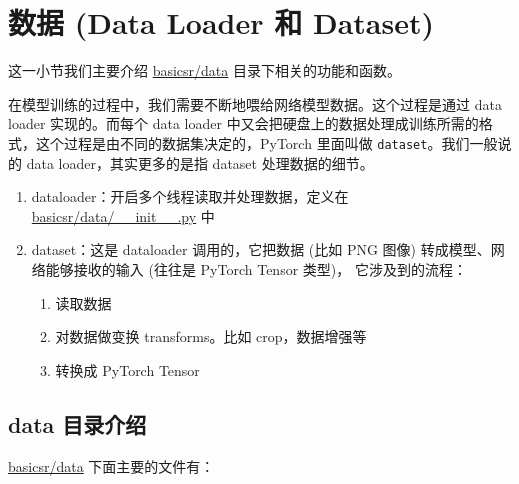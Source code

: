 \documentclass[../main.tex]{subfiles}
\begin{document}
\section{数据 (Data Loader 和 Dataset)}\label{code_structure:data}

这一小节我们主要介绍 \href{https://github.com/XPixelGroup/BasicSR/tree/master/basicsr/data}{basicsr/data} 目录下相关的功能和函数。

在模型训练的过程中，我们需要不断地喂给网络模型数据。这个过程是通过 data loader 实现的。而每个 data loader 中又会把硬盘上的数据处理成训练所需的格式，这个过程是由不同的数据集决定的，PyTorch 里面叫做 \texttt{dataset}。我们一般说的 data loader，其实更多的是指 dataset 处理数据的细节。

\begin{enumerate}
    \item dataloader：开启多个线程读取并处理数据，定义在 \href{https://github.com/XPixelGroup/BasicSR/blob/master/basicsr/data/\_\_init\_\_.py}{basicsr/data/\_\_init\_\_.py} 中
    \item dataset：这是 dataloader 调用的，它把数据 (比如 PNG 图像) 转成模型、网络能够接收的输入 (往往是 PyTorch Tensor 类型)， 它涉及到的流程：
          \begin{enumerate}
              \item 读取数据
              \item 对数据做变换 transforms。比如 crop，数据增强等
              \item 转换成 PyTorch Tensor
          \end{enumerate}
\end{enumerate}

\subsection{data 目录介绍}\label{code_structure:data_contents}

\href{https://github.com/XPixelGroup/BasicSR/tree/master/basicsr/data}{basicsr/data} 下面主要的文件有：

\vspace{0.5cm}
\renewcommand*\DTstyle{\ttfamily\textcolor{black}}
\vspace{0.5cm}
\end{document}
